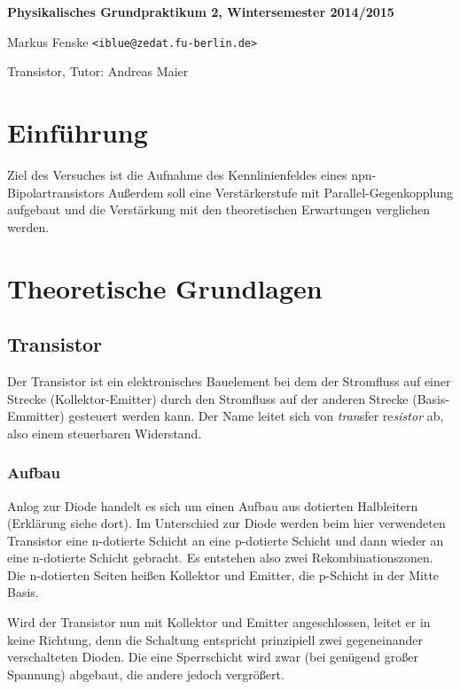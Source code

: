 \documentclass[a4paper,german,12pt,smallheadings]{scrartcl}
\begin{document}
\allowdisplaybreaks %
\begin{center}
\bfseries %
\sffamily %
\vspace{-40pt}
Physikalisches Grundpraktikum 2, Wintersemester 2014/2015

Markus Fenske \texttt{<iblue@zedat.fu-berlin.de>}

Transistor, Tutor: Andreas Maier
\vspace{-10pt}
\end{center}
\section{Einführung}
Ziel des Versuches ist die Aufnahme des Kennlinienfeldes eines
npn-Bipolartransistors  Außerdem soll eine Verstärkerstufe mit
Parallel-Gegenkopplung aufgebaut und die Verstärkung mit den theoretischen
Erwartungen verglichen werden.

\section{Theoretische Grundlagen}

\subsection{Transistor}

Der Transistor ist ein elektronisches Bauelement bei dem der Stromfluss auf
einer Strecke (Kollektor-Emitter) durch den Stromfluss auf der anderen Strecke
(Basis-Emmitter) gesteuert werden kann. Der Name leitet sich von
\textit{tran}sfer re\textit{sistor} ab, also einem steuerbaren Widerstand.

\subsubsection{Aufbau}

Anlog zur Diode handelt es sich um einen Aufbau aus dotierten Halbleitern
(Erklärung siehe dort). Im Unterschied zur Diode werden beim hier verwendeten
Transistor eine n-dotierte Schicht an eine p-dotierte Schicht und dann wieder
an eine n-dotierte Schicht gebracht. Es entstehen also zwei
Rekombinationszonen. Die n-dotierten Seiten heißen Kollektor und Emitter, die
p-Schicht in der Mitte Basis.

Wird der Transistor nun mit Kollektor und Emitter angeschlossen, leitet er in
keine Richtung, denn die Schaltung entspricht prinzipiell zwei gegeneinander
verschalteten Dioden. Die eine Sperrschicht wird zwar (bei genügend großer
Spannung) abgebaut, die andere jedoch vergrößert.
\end{document}
